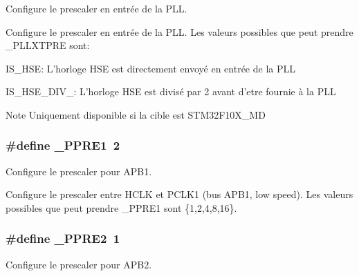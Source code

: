 Configure le prescaler en entrée de la P\+L\+L. 

Configure le prescaler en entrée de la P\+L\+L. Les valeurs possibles que peut prendre \+\_\+\+P\+L\+L\+X\+T\+P\+R\+E sont\+:
\begin{DoxyItemize}
\item I\+S\+\_\+\+H\+S\+E\+: L'horloge H\+S\+E est directement envoyé en entrée de la P\+L\+L
\item I\+S\+\_\+\+H\+S\+E\+\_\+\+D\+I\+V\+\_\+: L'horloge H\+S\+E est divisé par 2 avant d'etre fournie à la P\+L\+L \begin{DoxyNote}{Note}
Uniquement disponible si la cible est S\+T\+M32\+F10\+X\+\_\+\+M\+D 
\end{DoxyNote}

\end{DoxyItemize}\hypertarget{group__conf___c_l_o_c_k_ga961057d8de29befd974b2d51240d34b7}{
\subsubsection[{\+\_\+\+P\+P\+R\+E1}]{\setlength{\rightskip}{0pt plus 5cm}\#define \+\_\+\+P\+P\+R\+E1~2}}\label{group__conf___c_l_o_c_k_ga961057d8de29befd974b2d51240d34b7}


Configure le prescaler pour A\+P\+B1. 

Configure le prescaler entre H\+C\+L\+K et P\+C\+L\+K1 (bus A\+P\+B1, low speed). Les valeurs possibles que peut prendre \+\_\+\+P\+P\+R\+E1 sont \{1,2,4,8,16\}. \hypertarget{group__conf___c_l_o_c_k_ga4a84605b8fbe4331f82f31572873bc19}{
\subsubsection[{\+\_\+\+P\+P\+R\+E2}]{\setlength{\rightskip}{0pt plus 5cm}\#define \+\_\+\+P\+P\+R\+E2~1}}\label{group__conf___c_l_o_c_k_ga4a84605b8fbe4331f82f31572873bc19}


Configure le prescaler pour A\+P\+B2. 

